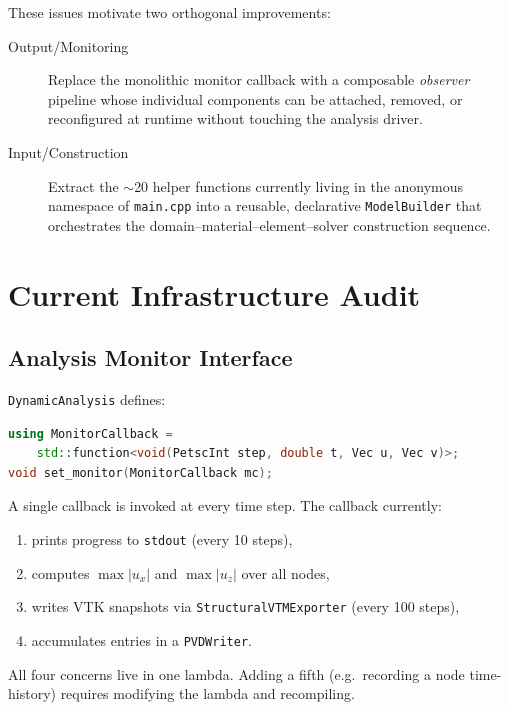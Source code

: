 These issues motivate two orthogonal improvements:
\begin{description}
  \item[Output/Monitoring] Replace the monolithic monitor callback with a
        composable \emph{observer} pipeline whose individual components
        can be attached, removed, or reconfigured at runtime without
        touching the analysis driver.
  \item[Input/Construction] Extract the $\sim$20 helper functions
        currently living in the anonymous namespace of \texttt{main.cpp}
        into a reusable, declarative \texttt{ModelBuilder} that
        orchestrates the domain--material--element--solver construction
        sequence.
\end{description}


\section{Current Infrastructure Audit}
\label{sec:obs-audit}

\subsection{Analysis Monitor Interface}

\texttt{DynamicAnalysis} defines:
\begin{lstlisting}[language=C++,basicstyle=\ttfamily\small]
using MonitorCallback =
    std::function<void(PetscInt step, double t, Vec u, Vec v)>;
void set_monitor(MonitorCallback mc);
\end{lstlisting}
A single callback is invoked at every time step.  The callback currently:
\begin{enumerate}\itemsep0pt
  \item prints progress to \texttt{stdout} (every 10 steps),
  \item computes $\max|u_x|$ and $\max|u_z|$ over all nodes,
  \item writes VTK snapshots via \texttt{StructuralVTMExporter}
        (every 100 steps),
  \item accumulates entries in a \texttt{PVDWriter}.
\end{enumerate}
All four concerns live in one lambda.  Adding a fifth (e.g.\ recording
a node time-history) requires modifying the lambda and recompiling.

